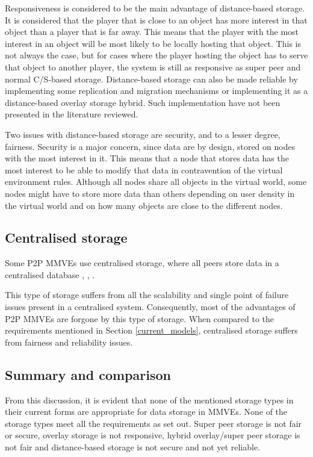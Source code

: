\documentclass[10pt,a4paper,conference]{IEEEtran}
\begin{document}
Responsiveness is considered to be the main advantage of distance-based storage. It is considered that the player that is close to an object has more
interest in that object than a player that is far away. This means that the player with the most interest in an object will be most likely to be
locally hosting that object. This is not always the case, but for cases where the player hosting the object has to serve that object to another
player, the system is still as responsive as super peer and normal C/S-based storage. Distance-based storage can also be made reliable by
implementing some replication and migration mechanisms or implementing it as a distance-based overlay storage hybrid. Such implementation have not
been presented in the literature reviewed.

Two issues with distance-based storage are security, and to a lesser degree, fairness. Security is a major concern, since data are by design, stored
on nodes with the most interest in it. This means that a node that stores data has the most interest to be able to modify that data in contravention
of the virtual environment rules. Although all nodes share all objects in the virtual world, some nodes might have to store more data than others
depending on user density in the virtual world and on how many objects are close to the different nodes.

\subsection{Centralised storage}

Some P2P MMVEs use centralised storage, where all peers store data in a centralised database \cite{badumna_engine},
\cite{rooney_centralised_storage}, \cite{hybrid_p2p_cs_centralised}.

This type of storage suffers from all the scalability and single point of failure issues present in a centralised system. Consequently, most of the
advantages of P2P MMVEs are forgone by this type of storage. When compared to the requirements mentioned in Section \ref{current_models}, centralised
storage suffers from fairness and reliability issues.

\subsection{Summary and comparison}

From this discussion, it is evident that none of the mentioned storage types in their current forms are appropriate for data storage in MMVEs. None
of the storage types meet all the requirements as set out. Super peer storage is not fair or secure, overlay storage is not responsive, hybrid
overlay/super peer storage is not fair and distance-based storage is not secure and not yet reliable.
\end{document}
